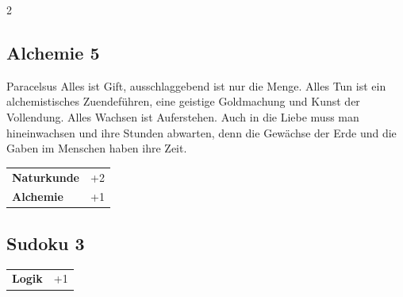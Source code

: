 \begin{multicols}{2}
\begin{tcolorbox}

\end{tcolorbox}

\begin{tcolorbox}
    \subsection*{Alchemie \hfill \small{5 }}
    \tcblower


\begin{pquote}{Paracelsus}
Alles ist Gift, ausschlaggebend ist nur die Menge. Alles Tun ist ein alchemistisches Zuendeführen, eine geistige Goldmachung und Kunst der Vollendung. Alles Wachsen ist Auferstehen. Auch in die Liebe muss man hineinwachsen und ihre Stunden abwarten, denn die Gewächse der Erde und die Gaben im Menschen haben ihre Zeit.
\end{pquote}

\vspace{3mm}

\begin{tabular}{@{}ll@{}}
    \textbf{Naturkunde} & +2\\
    \textbf{Alchemie} & +1\\
\end{tabular}


\end{tcolorbox}

\begin{tcolorbox}
    \subsection*{Sudoku \hfill \small{3 }}
    \tcblower




\begin{tabular}{@{}ll@{}}
    \textbf{Logik} & +1\\
\end{tabular}



\end{tcolorbox}
\end{multicols}

